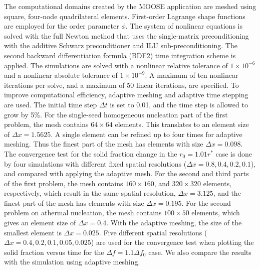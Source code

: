 \documentclass[preprint,12pt]{elsarticle}
\begin{document}

The computational domains created by the MOOSE application are meshed using square, four-node quadrilateral elements. First-order Lagrange shape functions are employed for the order parameter $\phi$. The system of nonlinear equations is solved with the full Newton method that uses the single-matrix preconditioning with the additive Schwarz preconditioner and ILU sub-preconditioning. The second backward differentiation formula (BDF2) time integration scheme is applied. The simulations are solved with a nonlinear relative tolerance of $1\times10^{-6}$ and a nonlinear absolute tolerance of $1\times10^{-9}$. A maximum of ten nonlinear iterations per solve, and a maximum of 50 linear iterations, are specified. To improve computational efficiency, adaptive meshing and adaptive time stepping are used. The initial time step $\Delta t$ is set to 0.01, and the time step is allowed to grow by 5\%. For the single-seed homogeneous nucleation part of the first problem, the mesh contains $64\times64$ elements. This translates to an element size of $\Delta x=1.5625$. A single element can be refined up to four times for adaptive meshing. Thus the finest part of the mesh has elements with size $\Delta x=0.098$. The convergence test for the solid fraction change in the $r_0=1.01r^*$ case is done by four simulations with different fixed spatial resolutions ($\Delta x=0.8, 0.4, 0.2, 0.1$), and compared with applying the adaptive mesh. For the second and third parts of the first problem, the mesh contains $160\times160$, and $320\times320$ elements, respectively, which result in the same spatial resolution, $\Delta x=3.125$, and the finest part of the mesh has elements with size $\Delta x=0.195$. For the second problem on athermal nucleation, the mesh contains $100\times50$ elements, which gives an element size of $\Delta x=0.4$. With the adaptive meshing, the size of the smallest element is $\Delta x=0.025$. 
Five different spatial resolutions ($\Delta x=0.4, 0.2, 0.1, 0.05, 0.025$) are used for the convergence test when plotting the solid fraction versus time for the $\Delta f=1.1\Delta f_0$ case. We also compare the results with the simulation using adaptive meshing.
\end{document}
